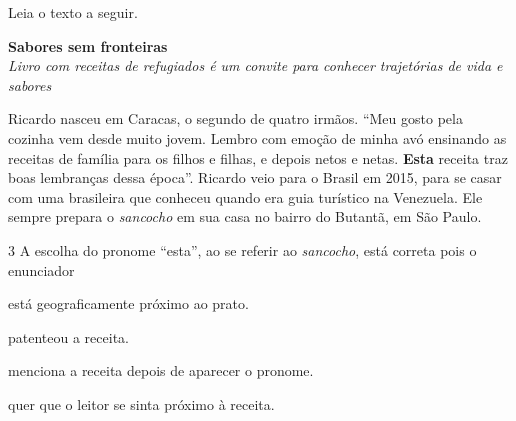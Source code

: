 Leia o texto a seguir.

\begin{myquote}
\begin{center}
\noindent \textbf{Sabores sem fronteiras}\\

\noindent \emph{Livro com receitas de refugiados é um convite para conhecer
trajetórias de vida e sabores}\\
\end{center}

\medskip

\noindent Ricardo nasceu em Caracas, o segundo de quatro irmãos. ``Meu gosto pela
cozinha vem desde muito jovem. Lembro com emoção de minha avó ensinando
as receitas de família para os filhos e filhas, e depois netos e netas.
\textbf{Esta} receita traz boas lembranças dessa época''. Ricardo veio
para o Brasil em 2015, para se casar com uma brasileira que conheceu
quando era guia turístico na Venezuela. Ele sempre prepara o
\emph{sancocho} em sua casa no bairro do Butantã, em São Paulo.

\end{myquote}

\num{3} A escolha do pronome ``esta'', ao se referir ao \emph{sancocho},
está correta pois o enunciador

\begin{escolha}
\item está geograficamente próximo ao prato.
\item patenteou a receita.
\item menciona a receita depois de aparecer o pronome.
\item quer que o leitor se sinta próximo à receita.
\end{escolha}



